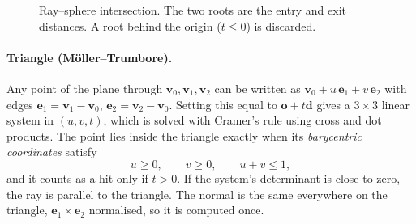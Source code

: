 \documentclass[11pt,a4paper]{article}
\newcommand{\vv}[1]{\mathbf{#1}}
\begin{document}
\begin{figure}[h]
\centering
\begin{subfigure}{0.48\textwidth}\centering
{}
\end{subfigure}
\begin{subfigure}{0.48\textwidth}\centering
{}
\end{subfigure}
\caption{Ray--sphere intersection. The two roots are the entry and exit
distances. A root behind the origin ($t\le 0$) is discarded.}
\end{figure}

\paragraph{Triangle (M\"oller--Trumbore).} Any point of the plane through
$\vv v_0,\vv v_1,\vv v_2$ can be written as $\vv v_0 + u\,\vv e_1 + v\,\vv e_2$
with edges $\vv e_1=\vv v_1-\vv v_0$, $\vv e_2=\vv v_2-\vv v_0$. Setting this
equal to $\vv o+t\vv d$ gives a $3\times3$ linear system in $(u,v,t)$, which is
solved with Cramer's rule using cross and dot products. The point lies inside the
triangle exactly when its \emph{barycentric coordinates} satisfy
\[
  u\ge 0,\qquad v\ge 0,\qquad u+v\le 1,
\]
and it counts as a hit only if $t>0$. If the system's determinant is close to
zero, the ray is parallel to the triangle. The normal is the same everywhere on
the triangle, $\vv e_1\times\vv e_2$ normalised, so it is computed once.
\end{document}
